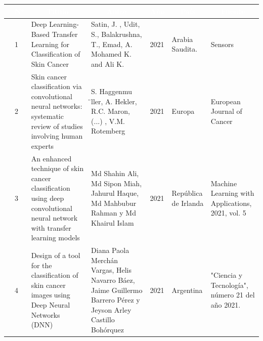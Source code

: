 \begin{table}[h]
	\newcommand{\multirot}[1]{\multirow{2}{*}[-8ex]{\rotcell{\rlap{#1}}}}
	\footnotesize
	\centering
	\begin{longtable}{|m{0.5cm}|m{0.3cm}|m{4cm}|m{2cm}|m{0.6cm}|m{1.7cm}|m{3cm}|} 
		\hline
		\rowcolor[rgb]{0,0.251,0.502} \multicolumn{1}{|c|}{\textcolor{white}{Tipo}} & \multicolumn{1}{c|}{\textcolor{white}{N°}} & \multicolumn{1}{c|}{\textcolor{white}{Título}}                                                                             & \multicolumn{1}{c|}{\textcolor{white}{Autor}}        & \multicolumn{1}{c|}{\textcolor{white}{Año}} & \multicolumn{1}{c|}{\textcolor{white}{País}} & \multicolumn{1}{c|}{\textcolor{white}{Fuente}}                                                        \\ 
		\hline
		\multirot{Problema}                                        & 1                                             & Deep Learning-Based Transfer Learning for Classification of Skin Cancer~                                                                               & Satin, J. , Udit, S., Balakrushna, T., Emad, A. Mohamed K. and Ali K. & 2021 &  Arabia Saudita. & Sensors \\ 
		\cline{2-7}
		& 2                                             & Skin cancer classification via convolutional neural networks: systematic review of studies involving human experts                                                          & S. Haggenmu ̈ller, A. Hekler, R.C. Maron,  (...) ,  V.M. Rotemberg                 & 2021                                        & Europa                                 & European Journal of Cancer                                                \\ 
		\hline
		\multirow{3}{*}[-14ex]{\rotcell{\rlap{Propuesta}}}
		& 3                                             & An enhanced technique of skin cancer classification using deep convolutional neural network with transfer learning models~                                                                               & Md Shahin Ali, Md Sipon Miah, Jahurul Haque, Md Mahbubur Rahman y Md Khairul Islam                                 & 2021                                        &  República de Irlanda         & Machine Learning with Applications, 2021, vol. 5                                                                  \\ 
		\cline{2-7}
		& 4                                             & Design of a tool for the classification of skin cancer imagesusing Deep Neural Networks (DNN)~                                                                                & Diana Paola Merchán Vargas, Helis Navarro Báez, Jaime Guillermo Barrero Pérez y Jeyson Arley Castillo Bohórquez                                          & 2021                                        & Argentina                                          & "Ciencia y Tecnología", número 21 del año 2021.                                                            \\ 
		

\end{longtable}
\end{table}
